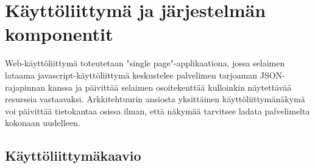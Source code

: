 \documentclass[a4paper,parskip=half]{scrartcl}
\begin{document}
\section{Käyttöliittymä ja järjestelmän komponentit}

Web-käyttöliittymä toteutetaan "single page"-applikaationa, jossa selaimen
lataama javascript-käyttöliittymä keskustelee palvelimen tarjoaman
JSON-rajapinnan kanssa ja päivittää selaimen osoitekenttää kulloinkin
näytettävää resurssia vastaavaksi. Arkkitehtuurin ansiosta yksittäinen
käyttöliittymänäkymä voi päivittää tietokantaa osissa ilman, että näkymää
tarvitsee ladata palvelimelta kokonaan uudelleen.

\subsection{Käyttöliittymäkaavio}
\end{document}
